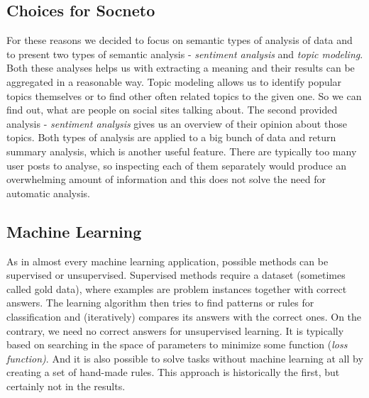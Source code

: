 \subsection{Choices for Socneto}
For these reasons we decided to focus on semantic types of analysis of data and to present two types of semantic analysis - \textit{sentiment analysis} and \textit{topic modeling}. Both these analyses helps us with extracting a meaning and their results can be aggregated in a reasonable way. Topic modeling allows us to identify popular topics themselves or to find other often related topics to the given one. So we can find out, what are people on social sites talking about. The second provided analysis - \textit{sentiment analysis} gives us an overview of their opinion about those topics. Both types of analysis are applied to a big bunch of data and return summary analysis, which is another useful feature. There are typically too many user posts to analyse, so inspecting each of them separately would produce an overwhelming amount of information and this does not solve the need for automatic analysis. 

\subsection{Machine Learning}

As in almost every machine learning application, possible methods can be supervised or unsupervised. Supervised methods require a dataset (sometimes called gold data), where  examples are problem instances together with correct answers. The learning algorithm then tries to find patterns or rules for classification and (iteratively) compares its answers with the correct ones. On the contrary, we need no correct answers for unsupervised learning. It is typically based on searching in the space of parameters to minimize some function (\textit{loss function)}. And it is also possible to solve tasks without machine learning at all by creating a set of hand-made rules. This approach is historically the first, but certainly not in the results.
